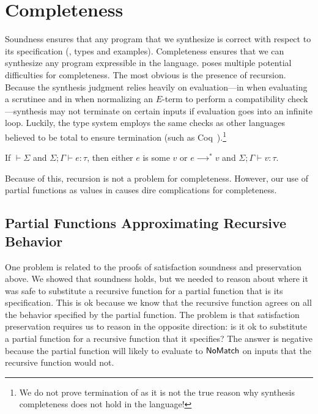 \section{Completeness}
\label{sec:completeness-of-mlsyn}

Soundness ensures that any program that we synthesize is correct with respect to its specification (\ie, types and examples).
Completeness ensures that we can synthesize any program expressible in the language.
\mlsyn{} poses multiple potential difficulties for completeness.
The most obvious is the presence of recursion.
Because the synthesis judgment relies heavily on evaluation---in  when evaluating a scrutinee and in  when normalizing an $E$-term to perform a compatibility check---synthesis may not terminate on certain inputs if evaluation goes into an infinite loop.
Luckily, the \mlsyn{} type system employs the same checks as other languages believed to be total to ensure termination (such as Coq~\citep{coq-2012}).\footnote{%
  We do not prove termination of \mlsyn{} as it is not the true reason why synthesis completeness does not hold in the language!
}
\begin{proofenv}
  \begin{theorem}
    If $⊢ Σ$ and $Σ; Γ ⊢ e : τ$, then either $e$ is some $v$ or $e ⟶^* v$ and $Σ; Γ ⊢ v : τ$.
  \end{theorem}
\end{proofenv}
Because of this, recursion is not a problem for completeness.
However, our use of partial functions as values in \mlsyn{} causes dire complications for completeness.

\subsection{Partial Functions Approximating Recursive Behavior}
One problem is related to the proofs of satisfaction soundness and preservation above.
We showed that soundness holds, but we needed to reason about where it was safe to substitute a recursive function for a partial function that is its specification.
This is ok because we know that the recursive function agrees on all the behavior specified by the partial function.
The problem is that satisfaction preservation requires us to reason in the opposite direction: is it ok to substitute a partial function for a recursive function that it specifies?
The answer is negative because the partial function will likely to evaluate to $\mathsf{NoMatch}$ on inputs that the recursive function would not.

